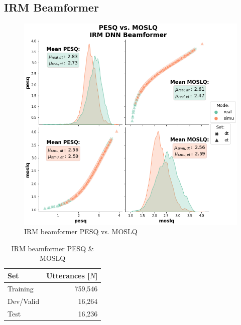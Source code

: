 \subsection{IRM Beamformer}
\begin{figure}[H]
    \centering
    \includegraphics[width=\linewidth]{Experiments/images/irm_pesq_mosq}
    \caption{IRM beamformer PESQ vs. MOSLQ}\label{fig:irm_pesq_mosq}
\end{figure}

\begin{table}[H]
    \centering
    \begin{tabular}{lr}
      \midrule
      Set & Utterances [\(N\)] \\
      \midrule
        Training    & 759,546   \\
        Dev/Valid   & 16,264   \\
        Test        & 16,236  \\
       \bottomrule
    \end{tabular}
    \caption{IRM beamformer PESQ \& MOSLQ}\label{tbl:comvoice_set_dstrb}
\end{table}

